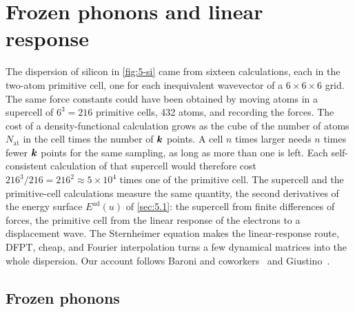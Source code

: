 \section{Frozen phonons and linear response}\label{sec:5.4}

The dispersion of silicon in \cref{fig:5-si} came from sixteen calculations, each in the two-atom primitive cell, one for each inequivalent wavevector of a $6\times6\times6$ grid. The same force constants could have been obtained by moving atoms in a supercell of $6^3 = 216$ primitive cells, 432 atoms, and recording the forces. The cost of a density-functional calculation grows as the cube of the number of atoms $N_{\mathrm{at}}$ in the cell times the number of $\bm{k}$ points. A cell $n$ times larger needs $n$ times fewer $\bm{k}$ points for the same sampling, as long as more than one is left. Each self-consistent calculation of that supercell would therefore cost $216^3/216 = 216^2 \approx 5\times10^4$ times one of the primitive cell. The supercell and the primitive-cell calculations measure the same quantity, the second derivatives of the energy surface $E^{\mathrm{ad}}(u)$ of \cref{sec:5.1}: the supercell from finite differences of forces, the primitive cell from the linear response of the electrons to a displacement wave. The Sternheimer equation makes the linear-response route, DFPT, cheap, and Fourier interpolation turns a few dynamical matrices into the whole dispersion. Our account follows Baroni and coworkers~\cite{baroni2001phonons} and Giustino~\cite{giustino2017electron}.

\subsection{Frozen phonons}


